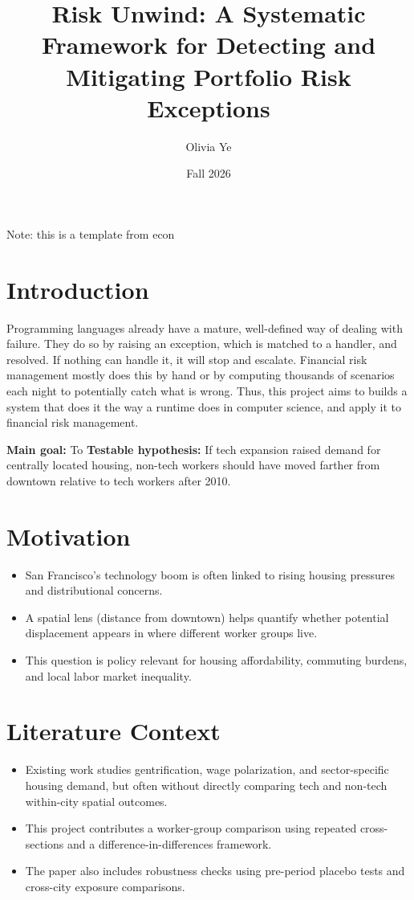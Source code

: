 \documentclass[12pt]{article}
\title{Risk Unwind: A Systematic Framework for Detecting and Mitigating Portfolio Risk Exceptions}
\author{Olivia Ye}
\date{Fall 2026}
\begin{document}
\maketitle
Note: this is a template from econ 

\section{Introduction}
Programming languages already have a mature, well-defined way of dealing with failure. They do so by raising an exception, which is matched to a handler, and resolved. If nothing can handle it, it will stop and escalate. Financial risk management mostly does this by hand or by computing thousands of scenarios each night to potentially catch what is wrong. 
Thus, this project aims to builds a system that does it the way a runtime does in computer science, and apply it to financial risk management.


\textbf{Main goal:} To 
\textbf{Testable hypothesis:} If tech expansion raised demand for centrally located housing, non-tech workers should have moved farther from downtown relative to tech workers after 2010.

\section{Motivation}
\begin{itemize}[leftmargin=*]
\item San Francisco's technology boom is often linked to rising housing pressures and distributional concerns.
\item A spatial lens (distance from downtown) helps quantify whether potential displacement appears in where different worker groups live.
\item This question is policy relevant for housing affordability, commuting burdens, and local labor market inequality.
\end{itemize}

\section{Literature Context}
\begin{itemize}[leftmargin=*]
\item Existing work studies gentrification, wage polarization, and sector-specific housing demand, but often without directly comparing tech and non-tech within-city spatial outcomes.
\item This project contributes a worker-group comparison using repeated cross-sections and a difference-in-differences framework.
\item The paper also includes robustness checks using pre-period placebo tests and cross-city exposure comparisons.
\end{itemize}
\end{document}
